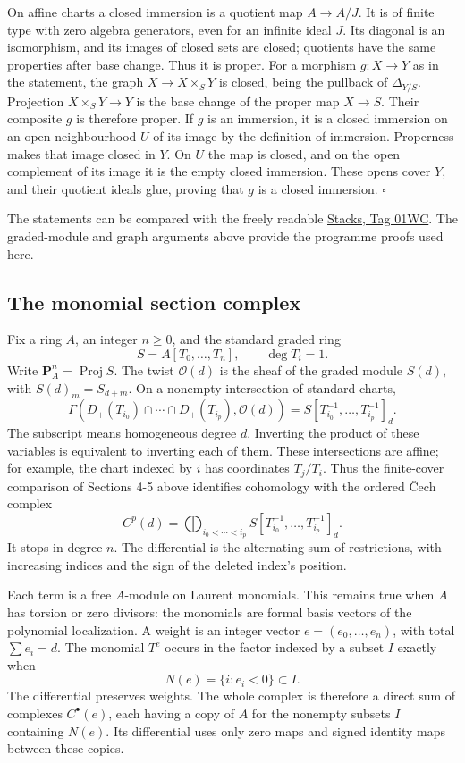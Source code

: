 \documentclass[11pt,a4paper,openany]{report}
\newcounter{none}
\begin{document}
On affine charts a closed immersion is a quotient map \(A\to A/J\). It is of finite type with zero algebra generators, even for an infinite ideal \(J\). Its diagonal is an isomorphism, and its images of closed sets are closed; quotients have the same properties after base change. Thus it is proper. For a morphism \(g:X\to Y\) as in the statement, the graph \(X\to X\times_SY\) is closed, being the pullback of \(\Delta_{Y/S}\). Projection \(X\times_SY\to Y\) is the base change of the proper map \(X\to S\). Their composite \(g\) is therefore proper. If \(g\) is an immersion, it is a closed immersion on an open neighbourhood \(U\) of its image by the definition of immersion. Properness makes that image closed in \(Y\). On \(U\) the map is closed, and on the open complement of its image it is the empty closed immersion. These opens cover \(Y\), and their quotient ideals glue, proving that \(g\) is a closed immersion. \(\square\)

The statements can be compared with the freely readable \href{https://stacks.math.columbia.edu/tag/01WC}{Stacks, Tag 01WC}. The graded-module and graph arguments above provide the programme proofs used here.

\subsection{The monomial section complex}\label{AG-RG-S01-the-monomial-section-complex}

Fix a ring \(A\), an integer \(n\ge0\), and the standard graded ring \[
S=A[T_0,\ldots,T_n],\qquad\deg T_i=1.
\] Write \(\mathbf P_A^n=\operatorname{Proj}S\). The twist \(\mathcal O(d)\) is the sheaf of the graded module \(S(d)\), with \(S(d)_m=S_{d+m}\). On a nonempty intersection of standard charts, \[
\Gamma(D_+(T_{i_0})\cap\cdots\cap D_+(T_{i_p}),\mathcal O(d))
=S[T_{i_0}^{-1},\ldots,T_{i_p}^{-1}]_d.
\] The subscript means homogeneous degree \(d\). Inverting the product of these variables is equivalent to inverting each of them. These intersections are affine; for example, the chart indexed by \(i\) has coordinates \(T_j/T_i\). Thus the finite-cover comparison of Sections 4-5 above identifies cohomology with the ordered Čech complex \[
C^p(d)=\bigoplus_{i_0<\cdots<i_p}
S[T_{i_0}^{-1},\ldots,T_{i_p}^{-1}]_d.
\] It stops in degree \(n\). The differential is the alternating sum of restrictions, with increasing indices and the sign of the deleted index's position.

Each term is a free \(A\)-module on Laurent monomials. This remains true when \(A\) has torsion or zero divisors: the monomials are formal basis vectors of the polynomial localization. A weight is an integer vector \(e=(e_0,\ldots,e_n)\), with total \(\sum e_i=d\). The monomial \(T^e\) occurs in the factor indexed by a subset \(I\) exactly when \[
N(e)=\{i:e_i<0\}\subset I.
\] The differential preserves weights. The whole complex is therefore a direct sum of complexes \(C^\bullet(e)\), each having a copy of \(A\) for the nonempty subsets \(I\) containing \(N(e)\). Its differential uses only zero maps and signed identity maps between these copies.
\end{document}
